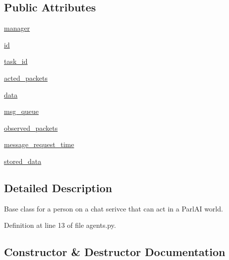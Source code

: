\subsection*{Public Attributes}
\begin{DoxyCompactItemize}
\item 
\hyperlink{classparlai_1_1chat__service_1_1core_1_1agents_1_1ChatServiceAgent_a8216a688db46e2aa7cdd023016ecf27c}{manager}
\item 
\hyperlink{classparlai_1_1chat__service_1_1core_1_1agents_1_1ChatServiceAgent_abb09786f0faf1d21a0521dd105f35c40}{id}
\item 
\hyperlink{classparlai_1_1chat__service_1_1core_1_1agents_1_1ChatServiceAgent_a1f1f978765ae81ca5ec8d04d14575386}{task\+\_\+id}
\item 
\hyperlink{classparlai_1_1chat__service_1_1core_1_1agents_1_1ChatServiceAgent_ac394b3601eb7039d5fb43c38795bbf49}{acted\+\_\+packets}
\item 
\hyperlink{classparlai_1_1chat__service_1_1core_1_1agents_1_1ChatServiceAgent_a6e02c9025ec3cf0ba64c58896ff97cc6}{data}
\item 
\hyperlink{classparlai_1_1chat__service_1_1core_1_1agents_1_1ChatServiceAgent_ae7b1e47cce1528d7f6836a0a6875e43a}{msg\+\_\+queue}
\item 
\hyperlink{classparlai_1_1chat__service_1_1core_1_1agents_1_1ChatServiceAgent_acb729e7d0bce867d891d15c08a3704fc}{observed\+\_\+packets}
\item 
\hyperlink{classparlai_1_1chat__service_1_1core_1_1agents_1_1ChatServiceAgent_a559242012ccef00ab3b2f9393cf67da6}{message\+\_\+request\+\_\+time}
\item 
\hyperlink{classparlai_1_1chat__service_1_1core_1_1agents_1_1ChatServiceAgent_a62cf09938c47f55c204637e56d089167}{stored\+\_\+data}
\end{DoxyCompactItemize}


\subsection{Detailed Description}
\begin{DoxyVerb}Base class for a person on a chat serivce that can act in a ParlAI world.
\end{DoxyVerb}
 

Definition at line 13 of file agents.\+py.



\subsection{Constructor \& Destructor Documentation}
\mbox{\label{classparlai_1_1chat__service_1_1core_1_1agents_1_1ChatServiceAgent_a75af2a1c4766564b0143595ed8a5e3c9}} 
